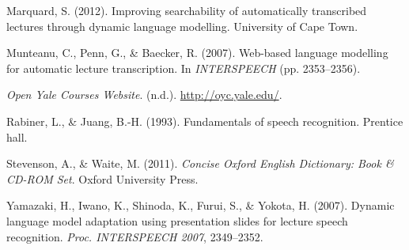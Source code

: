 \documentclass[]{article}
\begin{document}
Marquard, S. (2012). Improving searchability of automatically
transcribed lectures through dynamic language modelling. University of
Cape Town.

Munteanu, C., Penn, G., \& Baecker, R. (2007). Web-based language
modelling for automatic lecture transcription. In \emph{INTERSPEECH}
(pp. 2353--2356).

\emph{Open Yale Courses Website}. (n.d.). \url{http://oyc.yale.edu/}.

Rabiner, L., \& Juang, B.-H. (1993). Fundamentals of speech recognition.
Prentice hall.

Stevenson, A., \& Waite, M. (2011). \emph{Concise Oxford English
Dictionary: Book \& CD-ROM Set}. Oxford University Press.

Yamazaki, H., Iwano, K., Shinoda, K., Furui, S., \& Yokota, H. (2007).
Dynamic language model adaptation using presentation slides for lecture
speech recognition. \emph{Proc. INTERSPEECH 2007}, 2349--2352.
\end{document}
